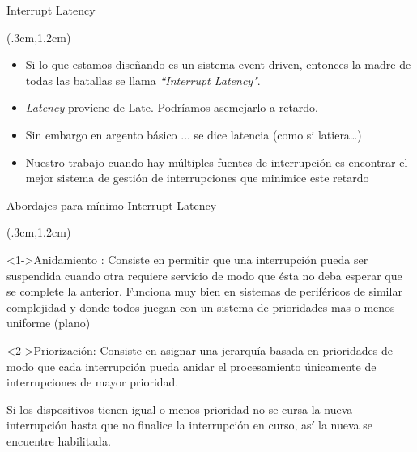 \documentclass[table,x11names,aspectratio=169]{beamer}
\begin{document}
\begin{frame}{Interrupt Latency}
 \begin{textblock*}{\textwidth}(.3cm,1.2cm)
  \begin{itemize}[<+(1)->] \justifying \parskip 0.3cm
   \item Si lo que estamos diseñando es un sistema event driven, entonces la madre de todas las batallas se llama  \textit{\textquotedblleft Interrupt Latency"}.
   \item \textit{Latency} proviene de Late. Podríamos asemejarlo a retardo.
   \item Sin embargo en argento básico ... se dice latencia (como si latiera\dots)
   \item Nuestro trabajo cuando hay múltiples fuentes de interrupción es encontrar el mejor sistema de gestión de interrupciones que minimice este retardo
  \end{itemize}
 \end{textblock*}
\end{frame}

\begin{frame}{Abordajes para mínimo Interrupt Latency}
 \begin{textblock*}{\textwidth}(.3cm,1.2cm)
  \begin{block}<1->{Anidamiento :}\justifying
   Consiste en permitir que una interrupción pueda ser suspendida cuando otra requiere servicio de modo que ésta no deba esperar que se complete la anterior. \newline
   Funciona muy bien en sistemas de periféricos de similar complejidad y donde todos juegan con un sistema de prioridades mas o menos uniforme (plano)
  \end{block} 
  \begin{block}<2->{Priorización:}\justifying
   Consiste en asignar una jerarquía basada en prioridades de modo que cada interrupción pueda anidar el procesamiento únicamente de interrupciones de mayor prioridad.

   Si los dispositivos tienen igual o menos prioridad no se cursa la nueva interrupción hasta que no finalice la interrupción en curso, así la nueva se encuentre habilitada.
  \end{block}
 \end{textblock*}
\end{frame}
\end{document}

